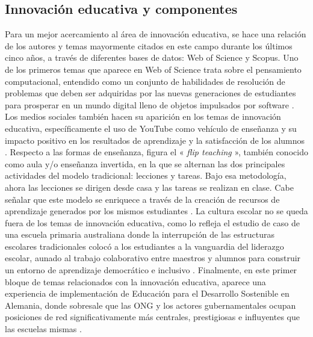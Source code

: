 \documentclass[spanish]{textolivre}
\begin{document}
\subsection{Innovación educativa y componentes}
Para un mejor acercamiento al área de innovación educativa, se hace una relación de los autores y temas mayormente citados en este campo durante los últimos cinco años, a través de diferentes bases de datos: Web of Science y Scopus. Uno de los primeros temas que aparece en Web of Science trata sobre el pensamiento computacional, entendido como un conjunto de habilidades de resolución de problemas que deben ser adquiridas por las nuevas generaciones de estudiantes para prosperar en un mundo digital lleno de objetos impulsados por software \cite{roman-gonzalez2017}. Los medios sociales también hacen su aparición en los temas de innovación educativa, específicamente el uso de YouTube como vehículo de enseñanza y su impacto positivo en los resultados de aprendizaje y la satisfacción de los alumnos \cite{orus2016}. Respecto a las formas de enseñanza, figura el « \emph{flip teaching} », también conocido como aula y/o enseñanza invertida, en la que se alternan las dos principales actividades del modelo tradicional: lecciones y tareas. Bajo esa metodología, ahora las lecciones se dirigen desde casa y las tareas se realizan en clase. Cabe señalar que este modelo se enriquece a través de la creación de recursos de aprendizaje generados por los mismos estudiantes \cite{fidalgo-blanco2017}. La cultura escolar no se queda fuera de los temas de innovación educativa, como lo refleja el estudio de caso de una escuela primaria australiana donde la interrupción de las estructuras escolares tradicionales colocó a los estudiantes a la vanguardia del liderazgo escolar, aunado al trabajo colaborativo entre maestros y alumnos para construir un entorno de aprendizaje democrático e inclusivo \cite{quinn2016}. Finalmente, en este primer bloque de temas relacionados con la innovación educativa, aparece una experiencia de implementación de Educación para el Desarrollo Sostenible en Alemania, donde sobresale que las ONG y los actores gubernamentales ocupan posiciones de red significativamente más centrales, prestigiosas e influyentes que las escuelas mismas \cite{kolleck2016}.
\end{document}
